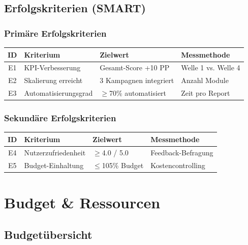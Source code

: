 \documentclass[11pt,a4paper]{article}
\begin{document}
\subsection{Erfolgskriterien (SMART)}

\subsubsection{Primäre Erfolgskriterien}

\begin{tabular}{c l l l}
\toprule
\textbf{ID} & \textbf{Kriterium} & \textbf{Zielwert} & \textbf{Messmethode}\\
\midrule
\rowcolor{falightgray} E1 & KPI-Verbesserung & Gesamt-Score +10 PP & Welle 1 vs. Welle 4\\
E2 & Skalierung erreicht & 3 Kampagnen integriert & Anzahl Module\\
\rowcolor{falightgray} E3 & Automatisierungsgrad & $\geq$70\% automatisiert & Zeit pro Report\\
\bottomrule
\end{tabular}

\subsubsection{Sekundäre Erfolgskriterien}

\begin{tabular}{c l l l}
\toprule
\textbf{ID} & \textbf{Kriterium} & \textbf{Zielwert} & \textbf{Messmethode}\\
\midrule
\rowcolor{falightgray} E4 & Nutzerzufriedenheit & $\geq$4.0 / 5.0 & Feedback-Befragung\\
E5 & Budget-Einhaltung & $\leq$105\% Budget & Kostencontrolling\\
\bottomrule
\end{tabular}

\newpage

\section{Budget \& Ressourcen}

\subsection{Budgetübersicht}
\end{document}
